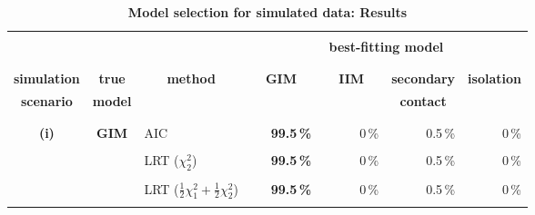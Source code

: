 \documentclass[11pt]{article}
\begin{document}
\begin{table}[!b]
\caption{\bf \\Model selection for simulated data: Results}
\label{modelresults}
\vspace*{-3mm}
\begin{center}
\hspace*{-0.65cm}
{\small \begin{tabular}{|c|c|l|rrrr|} \hline 
\vspace*{-2mm} & & & & & &  \\
 &  &  & \multicolumn{4}{c|}{\bf best-fitting model} \\  
\vspace*{-2mm} & & & & & &  \\
\cline{4-7} 
\vspace*{-2mm} & & & & & &  \\
{\bf simulation} & {\bf true}    & \multicolumn{1}{c|}{\bf method} & \multicolumn{1}{c}{\bf ~~GIM~~} & \multicolumn{1}{c}{\bf ~~IIM~~} & \multicolumn{1}{c}{\bf secondary} & \multicolumn{1}{c|}{\bf isolation} \\
{\bf scenario}    & {\bf model} &                                             &                                        &                                      & \multicolumn{1}{c}{\bf contact}     &                                               \\ 
\vspace*{-2mm} & & & & & &  \\
\hline 
\vspace*{-2mm} & & & & & &  \\
{\bf (i)} & {\bf GIM} & AIC                                                                                                          & {\bf 99.5\,\%} & 0\,\% &0.5\,\% & 0\,\% \\
\vspace*{-3mm} & & & & & &  \\
            &                & LRT ($\chi^2_2$)                                                                                      & {\bf 99.5\,\%} & 0\,\% &0.5\,\% & 0\,\% \\ 
\vspace*{-3mm} & & & & & &  \\
            &                & LRT ($\frac{1}{2} \chi^2_1 +\frac{1}{2} \chi^2_2$)                                   & {\bf 99.5\,\%} & 0\,\% &0.5\,\% & 0\,\% \\
\vspace*{-3mm} & & & & & &  \\

\end{tabular}}
\end{center}
\end{table}
\end{document}
